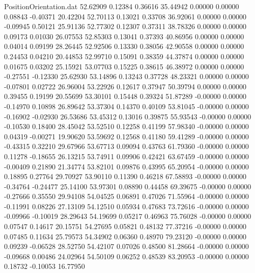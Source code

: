 \begin{filecontents}{PositionOrientation.dat}
  52.62909    0.12384    0.36616    35.44942    0.00000    0.00000    0.08843   -0.40371   20.42204
  52.70113    0.13021    0.33708    36.92061    0.00000    0.00000   -0.09945    0.50121   25.91136
  52.77302    0.12307    0.37311    38.78326    0.00000    0.00000    0.09173    0.01030   26.07553
  52.85303    0.13041    0.37393    40.86956    0.00000    0.00000    0.04014    0.09199   28.26445
  52.92506    0.13330    0.38056    42.90558    0.00000    0.00000    0.24453    0.04210   20.44853
  52.99710    0.15091    0.38359    44.37874    0.00000    0.00000    0.01675    0.03202   25.15921
  53.07703    0.15225    0.38615    46.38972    0.00000    0.00000   -0.27551   -0.12330   25.62930
  53.14896    0.13243    0.37728    48.23321    0.00000    0.00000   -0.07801    0.02722   26.96004
  53.22926    0.12617    0.37947    50.39794    0.00000    0.00000    0.39455    0.19199   20.55699
  53.30101    0.15448    0.39324    51.87289   -0.00000    0.00000   -0.14970    0.10898   26.89642
  53.37304    0.14370    0.40109    53.81045   -0.00000    0.00000   -0.16902   -0.02930   26.53686
  53.45312    0.13016    0.39875    55.93543   -0.00000    0.00000   -0.10530    0.18400   28.45042
  53.52510    0.12258    0.41199    57.98340   -0.00000    0.00000    0.04319   -0.00271   19.90620
  53.59692    0.12568    0.41180    59.41289   -0.00000    0.00000   -0.43315    0.32210   29.67966
  53.67713    0.09094    0.43763    61.79360   -0.00000    0.00000    0.11278   -0.18655   26.13215
  53.74911    0.09906    0.42421    63.67459   -0.00000    0.00000   -0.00409    0.21890   21.34774
  53.82101    0.09876    0.43995    65.20954   -0.00000    0.00000    0.18895    0.27764   29.70927
  53.90110    0.11390    0.46218    67.58893   -0.00000    0.00000   -0.34764   -0.24477   25.14100
  53.97301    0.08890    0.44458    69.39675   -0.00000    0.00000   -0.27666    0.35550   29.94108
  54.04525    0.06891    0.47026    71.55964   -0.00000    0.00000   -0.11991    0.08226   27.13109
  54.12510    0.05934    0.47683    73.72616   -0.00000    0.00000   -0.09966   -0.10019   28.29643
  54.19699    0.05217    0.46963    75.76028   -0.00000    0.00000    0.07547    0.14617   20.15751
  54.27695    0.05821    0.48132    77.37216   -0.00000    0.00000    0.07485    0.11634   25.79573
  54.34902    0.06360    0.48970    79.23120   -0.00000    0.00000    0.09239   -0.06528   28.52750
  54.42107    0.07026    0.48500    81.28664   -0.00000    0.00000   -0.09668    0.00486   24.02964
  54.50109    0.06252    0.48539    83.20953   -0.00000    0.00000    0.18732   -0.10053   16.77950

\end{filecontents}
